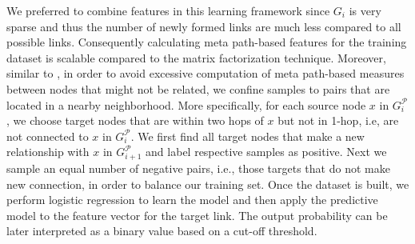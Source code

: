 We preferred to combine features in this learning framework since $G_i$ is very sparse and thus the number of newly formed links are much less compared to all possible links. Consequently calculating meta path-based features for the training dataset is scalable compared to the matrix factorization technique. Moreover, similar to \cite{sun2011ASONAM}, in order to avoid excessive computation of meta path-based measures between nodes that might not be related, we confine samples to pairs that are located in a nearby neighborhood. More specifically, for each source node $x$ in $G^\mathcal{P}_{i}$, we choose target nodes that are within two hops of $x$ but not in 1-hop, i.e, are not connected to $x$ in $G^\mathcal{P}_{i}$. We first find all target nodes that make a new relationship with $x$  in $G^\mathcal{P}_{i+1}$ and label respective samples as positive. Next we sample an equal number of negative pairs, i.e., those targets that do not make new connection, in order to balance our training set. Once the dataset is built, we perform logistic regression to learn the model and then apply the predictive model to the feature vector for the target link. The output probability can be later interpreted as a binary value based on a cut-off threshold.











